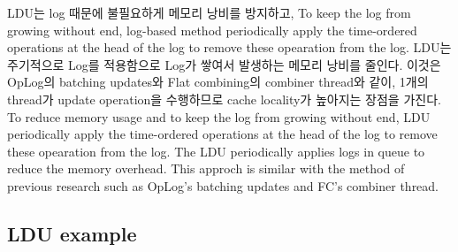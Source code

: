 
\ifkor
LDU는 log 때문에 불필요하게 메모리 낭비를 방지하고, To keep the log from growing without end,
log-based method periodically apply the time-ordered operations at the head of
the log to remove these opearation from the log.
LDU는 주기적으로 Log를 적용함으로 Log가 쌓여서 발생하는 메모리 낭비를 줄인다. 
이것은 OpLog의 batching updates와 Flat combining의 combiner thread와 같이, 1개의
thread가 update operation을 수행하므로 cache locality가 높아지는 장점을 가진다. 
\else
To reduce memory usage and to keep the log from growing without end, LDU
periodically apply the time-ordered operations at the head of the log to remove
these opearation from the log.
The LDU periodically applies logs in queue to reduce the memory overhead.
This approch is similar with the method of previous research such as OpLog's
batching updates and FC's combiner thread.

\fi




\subsection{LDU example}


